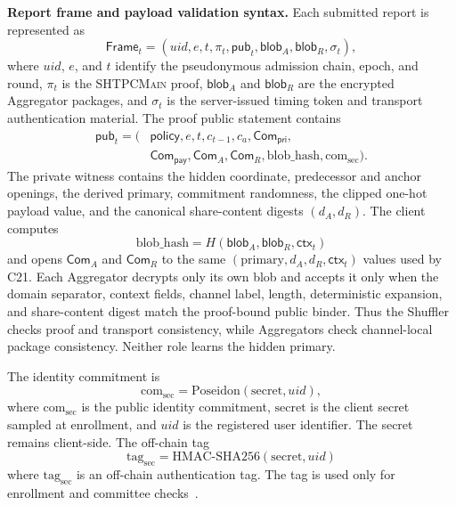 \documentclass[journal]{IEEEtran}
\theoremstyle{definition}
\theoremstyle{plain}
\begin{document}
\noindent\textbf{Report frame and payload validation syntax.}
Each submitted report is represented as
\begin{equation}
  \mathsf{Frame}_t=
  (uid,e,t,\pi_t,\mathsf{pub}_t,\mathsf{blob}_A,\mathsf{blob}_R,\sigma_t),
\end{equation}
\noindent where \(uid\), \(e\), and \(t\) identify the pseudonymous admission
chain, epoch, and round, \(\pi_t\) is the \textsc{SHTPCMain} proof,
\(\mathsf{blob}_A\) and \(\mathsf{blob}_R\) are the encrypted Aggregator
packages, and \(\sigma_t\) is the server-issued timing token and transport
authentication material. The proof public statement contains
\begin{equation}
  \begin{aligned}
  \mathsf{pub}_t = (&\mathsf{policy},e,t,c_{t-1},c_a,
  \mathsf{Com}_{\mathsf{pri}},\\
  &\mathsf{Com}_{\mathsf{pay}},
  \mathsf{Com}_{A},\mathsf{Com}_{R},
  \mathrm{blob\_hash},\mathrm{com}_{\mathrm{sec}}).
  \end{aligned}
\end{equation}
\noindent The private witness contains the hidden coordinate, predecessor and
anchor openings, the derived primary, commitment randomness, the clipped
one-hot payload value, and the canonical share-content digests
\((d_A,d_R)\). The client computes
\[
  \mathrm{blob\_hash}=H(\mathsf{blob}_A,\mathsf{blob}_R,\mathsf{ctx}_t)
\]
and opens \(\mathsf{Com}_{A}\) and \(\mathsf{Com}_{R}\) to the same
\((\mathrm{primary},d_A,d_R,\mathsf{ctx}_t)\) values used by C21. Each
Aggregator decrypts only its own blob and accepts it only when the domain
separator, context fields, channel label, length, deterministic expansion, and
share-content digest match the proof-bound public binder. Thus the Shuffler
checks proof and transport consistency, while Aggregators check channel-local
package consistency. Neither role learns the hidden primary.

The identity commitment is
\begin{equation}
  \mathrm{com}_{\mathrm{sec}}=\mathrm{Poseidon}(\mathrm{secret},uid),
\end{equation}
\noindent where $\mathrm{com}_{\mathrm{sec}}$ is the public identity commitment,
$\mathrm{secret}$ is the client secret sampled at enrollment, and $uid$ is the
registered user identifier. The secret remains client-side. The off-chain tag
\begin{equation}
  \mathrm{tag}_{\mathrm{sec}}
  =
  \mathrm{HMAC}\text{-}\mathrm{SHA256}(\mathrm{secret},uid)
\end{equation}
\noindent where $\mathrm{tag}_{\mathrm{sec}}$ is an off-chain authentication tag.
The tag is used only for enrollment and committee checks~\cite{Bellare1996HMAC}.
\end{document}
